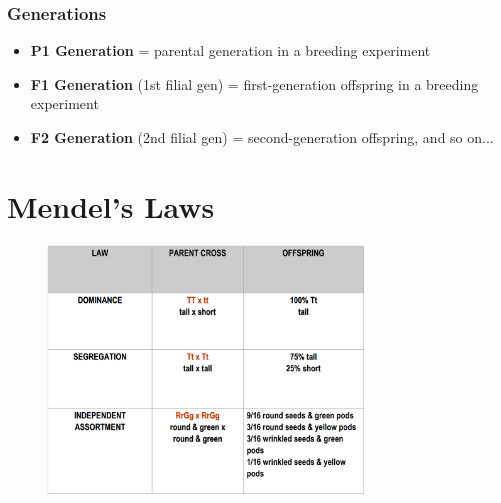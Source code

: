 \documentclass[a4paper,12pt]{article}
\begin{document}
\subsubsection{Generations}
\begin{itemize}
    \item{\textbf{P1 Generation} = parental generation in a breeding experiment}
    \item{\textbf{F1 Generation} (1st filial gen) = first-generation offspring in a breeding experiment}
    \item{\textbf{F2 Generation} (2nd filial gen) = second-generation offspring, and so on...}
\end{itemize}

\section{Mendel's Laws}
\begin{figure}[H]
    \centering
    \includegraphics[width=0.75\textwidth]{laws}
\end{figure}
\end{document}
